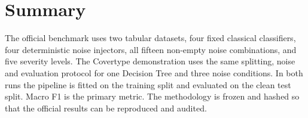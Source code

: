 \section{Summary}

The official benchmark uses two tabular datasets, four fixed classical classifiers, four deterministic noise injectors, all fifteen non-empty noise combinations, and five severity levels. The Covertype demonstration uses the same splitting, noise and evaluation protocol for one Decision Tree and three noise conditions. In both runs the pipeline is fitted on the training split and evaluated on the clean test split. Macro F1 is the primary metric. The methodology is frozen and hashed so that the official results can be reproduced and audited.
